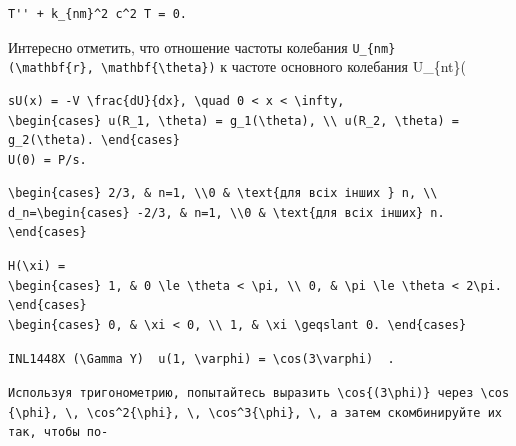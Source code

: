 \documentclass[
  ukrainian,
]{article}
\begin{document}
\begin{verbatim}
T'' + k_{nm}^2 c^2 T = 0.
\end{verbatim}

Интересно отметить, что отношение частоты колебания
\texttt{U\_\{nm\}(\textbackslash{}mathbf\{r\},\ \textbackslash{}mathbf\{\textbackslash{}theta\})}
к частоте основного колебания U\_\{nt\}(\ma

\begin{verbatim}
sU(x) = -V \frac{dU}{dx}, \quad 0 < x < \infty,
\begin{cases} u(R_1, \theta) = g_1(\theta), \\ u(R_2, \theta) = g_2(\theta). \end{cases}
U(0) = P/s.
\end{verbatim}

\begin{verbatim}
\begin{cases} 2/3, & n=1, \\0 & \text{для всіх інших } n, \\ d_n=\begin{cases} -2/3, & n=1, \\0 & \text{для всіх інших} n. \end{cases}
\end{verbatim}

\begin{verbatim}
H(\xi) =
\begin{cases} 1, & 0 \le \theta < \pi, \\ 0, & \pi \le \theta < 2\pi. \end{cases}
\begin{cases} 0, & \xi < 0, \\ 1, & \xi \geqslant 0. \end{cases}
\end{verbatim}

\texttt{INL1448X\ (\textbackslash{}Gamma\ Y)\ \ u(1,\ \textquotesingle{}\textbackslash{}varphi\textquotesingle{})\ =\ \textbackslash{}cos(3\textquotesingle{}\textbackslash{}varphi\textquotesingle{})\ \ .}

\texttt{Используя\ тригонометрию,\ попытайтесь\ выразить\ \textquotesingle{}\textbackslash{}cos\{(3\textbackslash{}phi)\}\textquotesingle{}\ через\ \textquotesingle{}\textbackslash{}cos\{\textbackslash{}phi\},\ \textbackslash{},\ \textbackslash{}cos\^{}2\{\textbackslash{}phi\},\ \textbackslash{},\ \textbackslash{}cos\^{}3\{\textbackslash{}phi\},\ \textbackslash{},\ a\textquotesingle{}\ затем\ скомбинируйте\ их\ так,\ чтобы\ по-}
\end{document}
